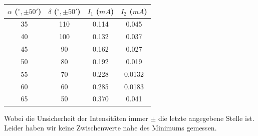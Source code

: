 \documentclass[twoside]{article}
\begin{document}
\begin{table}[H]
\begin{center}
\begin{tabular}{|c|c|c|c|}
\hline
$\alpha$ ($^\circ, \pm 50'$) & $\delta$ ($^\circ, \pm 50'$) & $I_1$ ($\si{mA}$) & $I_2$ ($\si{mA}$)\\
\hline
35 & 110 & 0.114 & 0.045\\
40 & 100 & 0.132 & 0.037\\
45 & 90 & 0.162 & 0.027\\
50 & 80 & 0.192 & 0.019\\
55 & 70 & 0.228 & 0.0132\\
60 & 60 & 0.285 & 0.0183\\
65 & 50 & 0.370 & 0.041\\
\hline
\end{tabular}
\end{center}
\end{table}
\vspace{0.5mm}

Wobei die Unsicherheit der Intensitäten immer $\pm$ die letzte angegebene Stelle ist. Leider haben wir keine Zwischenwerte nahe des Minimums gemessen.
\end{document}
